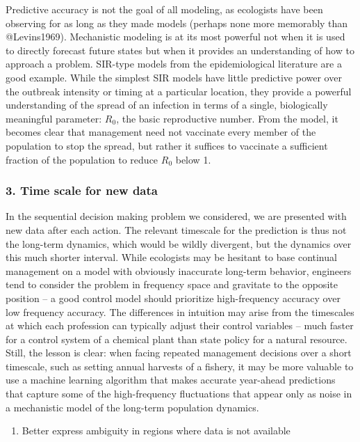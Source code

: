 \documentclass[author-year, review]{elsarticle} %
\begin{document}
Predictive accuracy is not the goal of all modeling, as ecologists have
been observing for as long as they made models (perhaps none more
memorably than @Levins1969). Mechanistic modeling is at its most
powerful not when it is used to directly forecast future states but when
it provides an understanding of how to approach a problem. SIR-type
models from the epidemiological literature are a good example. While the
simplest SIR models have little predictive power over the outbreak
intensity or timing at a particular location, they provide a powerful
understanding of the spread of an infection in terms of a single,
biologically meaningful parameter: $R_0$, the basic reproductive number.
From the model, it becomes clear that management need not vaccinate
every member of the population to stop the spread, but rather it
suffices to vaccinate a sufficient fraction of the population to reduce
$R_0$ below 1.

\subsubsection{3. Time scale for new data}

In the sequential decision making problem we considered, we are
presented with new data after each action. The relevant timescale for
the prediction is thus not the long-term dynamics, which would be wildly
divergent, but the dynamics over this much shorter interval. While
ecologists may be hesitant to base continual management on a model with
obviously inaccurate long-term behavior, engineers tend to consider the
problem in frequency space and gravitate to the opposite position -- a
good control model should prioritize high-frequency accuracy over low
frequency accuracy. The differences in intuition may arise from the
timescales at which each profession can typically adjust their control
variables -- much faster for a control system of a chemical plant than
state policy for a natural resource. Still, the lesson is clear: when
facing repeated management decisions over a short timescale, such as
setting annual harvests of a fishery, it may be more valuable to use a
machine learning algorithm that makes accurate year-ahead predictions
that capture some of the high-frequency fluctuations that appear only as
noise in a mechanistic model of the long-term population dynamics.

\begin{enumerate}
\def\labelenumi{\arabic{enumi}.}
\setcounter{enumi}{1}
\itemsep1pt\parskip0pt
\item
  Better express ambiguity in regions where data is not available
\end{enumerate}
\end{document}
